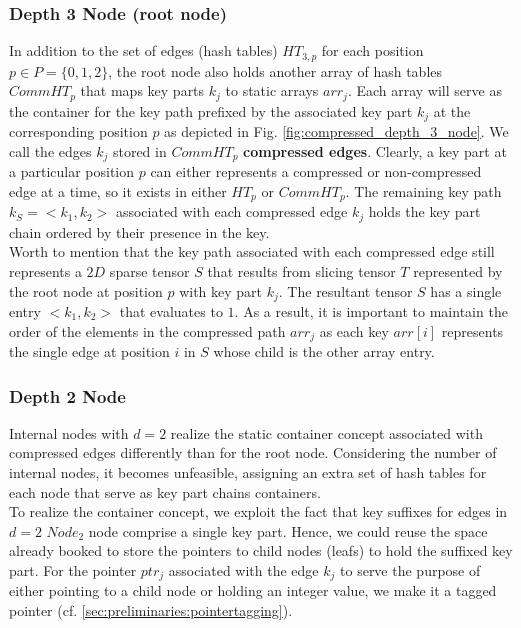 \subsubsection{Depth 3 Node (root node)} 
In addition to the set of edges (hash tables) $HT_{3,p}$ for each position $p \in P = \{0, 1, 2\}$, the root node also holds another array of hash tables $CommHT_{p}$ that maps key parts $k_{j}$ to static arrays $arr_{j}$. 
Each array will serve as the container for the key path prefixed by the associated key part $k_{j}$ at the corresponding position $p$ as depicted in Fig. \ref{fig:compressed_depth_3_node}. 
We call the edges $k_{j}$ stored  in $CommHT_{p}$ \textbf{compressed edges}. Clearly, a key part at a particular position $p$ can either represents a compressed or non-compressed edge at a time, so it exists in either $HT_{p}$ or $CommHT_{p}$. 
The remaining key path $k_{S} = <k_{1}, k_{2}>$ associated with each compressed edge $k_{j}$ holds the key part chain ordered by their presence in the key. \\

Worth to mention that the key path associated with each compressed edge still represents a $2D$ sparse tensor $S$ that results from slicing tensor $T$ represented by the root node at position $p$ with key part $k_{j}$. The resultant tensor $S$ has a single entry $<k_{1}, k_{2}>$ that evaluates to $1$. 
As a result, it is important to maintain the order of the elements in the compressed path $arr_{j}$ as each key $arr[i]$ represents the single edge at position $i$ in $S$ whose child is the other array entry. \\

\subsubsection{Depth 2 Node} Internal nodes with $d=2$ realize the static container concept associated with compressed edges differently than for the root node. 
Considering the number of internal nodes, it becomes unfeasible, assigning an extra set of hash tables for each node that serve as key part chains containers. \\

To realize the container concept, we exploit the fact that key suffixes for edges in $d=2$ $Node_{2}$ node comprise a single key part.
Hence, we could reuse the space already booked to store the pointers to child nodes (leafs) to hold the suffixed key part.
For the pointer $ptr_{j}$ associated with the edge $k_{j}$ to serve the purpose of either pointing to a child node or holding an integer value, we make it a tagged pointer (cf. \ref{sec:preliminaries:pointertagging}). \\

